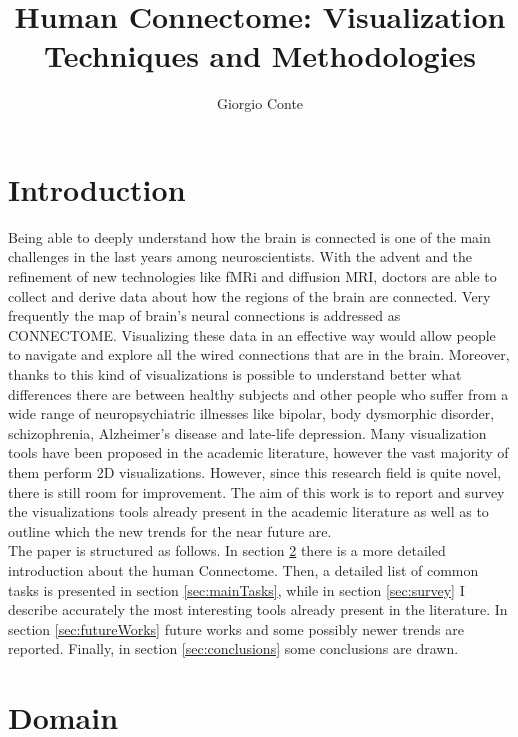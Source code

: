 \documentclass{article}
\title{Human Connectome: Visualization Techniques and Methodologies}
\author{Giorgio Conte}
\affil{Creative Coding Research Group\\ Department of Computer Science\\University of Illinois at Chicago}
\begin{document}
\maketitle
\begin{abstract}
\end{abstract}

\begin{multicols}{2}
\raggedcolumns

\section{Introduction}
\label{sec:introduction}

Being able to deeply understand how the brain is connected is one of the main challenges in the last years among neuroscientists. With the advent and the refinement of new technologies like fMRi and diffusion MRI, doctors are able to collect and derive data about how the regions of the brain are connected. Very frequently the map of brain's neural connections is addressed as CONNECTOME.
Visualizing these data in an effective way would allow people to navigate and explore all the wired connections that are in the brain. Moreover, thanks to this kind of visualizations is possible to understand better what differences there are between healthy subjects and other people who suffer from a wide range of neuropsychiatric illnesses like bipolar, body dysmorphic disorder, schizophrenia, Alzheimer's disease and late-life depression. 
Many visualization tools have been proposed in the academic literature, however the vast majority of them perform 2D visualizations. However, since this research field is quite novel, there is still room for improvement.
The aim of this work is to report and survey the visualizations tools already present in the academic literature as well as to outline which the new trends for the near future are.\\
The paper is structured as follows. In section \ref{sec:domain} there is a more detailed introduction about the human Connectome. Then, a detailed list of common tasks is presented in section \ref{sec:mainTasks}, while in section \ref{sec:survey} I describe accurately the most interesting tools already present in the literature. In section \ref{sec:futureWorks} future works and some possibly newer trends are reported. Finally, in section \ref{sec:conclusions} some conclusions are drawn.
\section{Domain}
\label{sec:domain}


\end{multicols}
\end{document}
